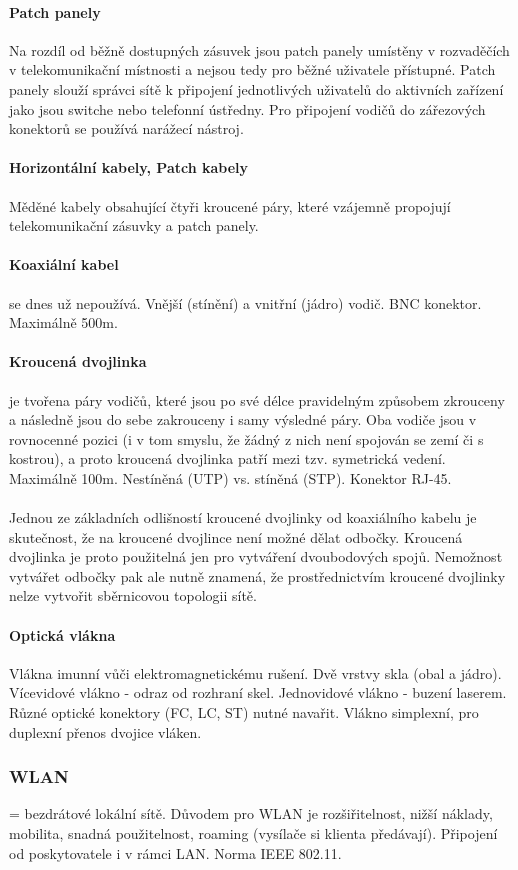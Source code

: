 \documentclass[10pt,a4paper]{article}
\begin{document}
\paragraph{Patch panely} Na rozdíl od běžně dostupných zásuvek jsou patch panely umístěny v rozvaděčích v telekomunikační místnosti a nejsou tedy pro běžné uživatele přístupné. Patch panely slouží správci sítě k připojení jednotlivých uživatelů do aktivních zařízení jako jsou switche nebo telefonní ústředny. Pro připojení vodičů do zářezových konektorů se používá narážecí nástroj.
\paragraph{Horizontální kabely, Patch kabely} Měděné kabely obsahující čtyři kroucené páry, které vzájemně propojují telekomunikační zásuvky a patch panely.
\paragraph{Koaxiální kabel} se dnes už nepoužívá. Vnější (stínění) a vnitřní (jádro) vodič. BNC konektor. Maximálně 500m.
\paragraph{Kroucená dvojlinka} je tvořena páry vodičů, které jsou po své délce pravidelným způsobem zkrouceny a následně jsou do sebe zakrouceny i samy výsledné páry. Oba vodiče jsou v rovnocenné pozici (i v tom smyslu, že žádný z nich není spojován se zemí či s kostrou), a proto kroucená dvojlinka patří mezi tzv. symetrická vedení. Maximálně 100m. Nestíněná (UTP) vs. stíněná (STP). Konektor RJ-45. \\ \\
Jednou ze základních odlišností kroucené dvojlinky od koaxiálního kabelu je skutečnost, že na kroucené dvojlince není možné dělat odbočky. Kroucená dvojlinka je proto použitelná jen pro vytváření dvoubodových spojů. Nemožnost vytvářet odbočky pak ale nutně znamená, že prostřednictvím kroucené dvojlinky nelze vytvořit sběrnicovou topologii sítě.
\paragraph{Optická vlákna} Vlákna imunní vůči elektromagnetickému rušení. Dvě vrstvy skla (obal a jádro). Vícevidové vlákno - odraz od rozhraní skel. Jednovidové vlákno - buzení laserem. Různé optické konektory (FC, LC, ST) nutné navařit. Vlákno simplexní, pro duplexní přenos dvojice vláken.
\subsubsection{WLAN}
= bezdrátové lokální sítě. Důvodem pro WLAN je rozšiřitelnost, nižší náklady, mobilita, snadná použitelnost, roaming (vysílače si klienta předávají). Připojení od poskytovatele i v rámci LAN. Norma IEEE 802.11.
\end{document}
